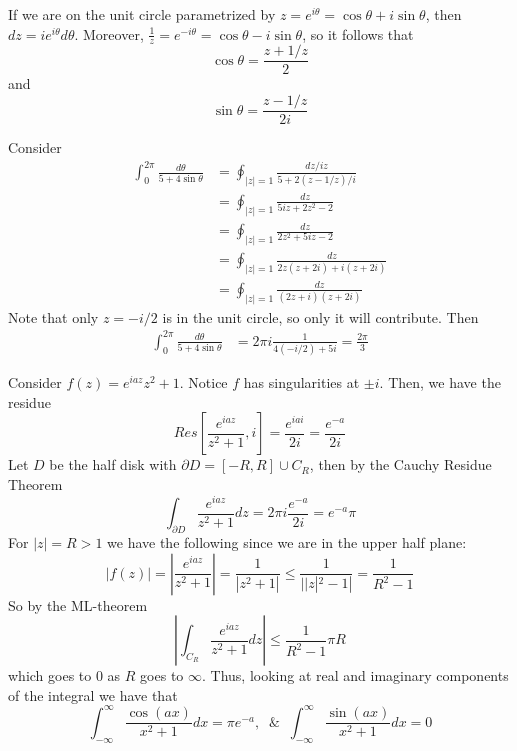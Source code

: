If we are on the unit circle parametrized by $z=e^{i\theta}=\cos\theta + i\sin\theta$, then $dz = ie^{i\theta}d\theta$. Moreover, $\frac{1}{z} = e^{-i\theta} = \cos\theta-i\sin\theta$, so it follows that $$\cos\theta = \frac{z+1/z}{2}$$ and $$\sin\theta = \frac{z-1/z}{2i}$$


\begin{example}
    Consider \begin{align*}
        \int_0^{2\pi}\frac{d\theta}{5+4\sin\theta} &= \oint_{|z|=1}\frac{dz/iz}{5+2(z-1/z)/i} \\
        &= \oint_{|z| = 1}\frac{dz}{5iz+2z^2-2} \\
        &= \oint_{|z| = 1}\frac{dz}{2z^2+5iz-2} \\
        &= \oint_{|z| =1}\frac{dz}{2z(z+2i)+i(z+2i)} \\
        &= \oint_{|z| = 1}\frac{dz}{(2z+i)(z+2i)}
    \end{align*}
    Note that only $z = -i/2$ is in the unit circle, so only it will contribute. Then \begin{align*}
        \int_0^{2\pi}\frac{d\theta}{5+4\sin\theta} &= 2\pi i\frac{1}{4(-i/2)+5i} = \frac{2\pi}{3}
    \end{align*}
\end{example}


\begin{example}
    Consider $f(z) = e^{iaz}{z^2+1}$. Notice $f$ has singularities at $\pm i$. Then, we have the residue \begin{equation*}
        Res\left[\frac{e^{iaz}}{z^2+1},i\right] = \frac{e^{iai}}{2i} = \frac{e^{-a}}{2i}
    \end{equation*}
    Let $D$ be the half disk with $\partial D = [-R,R]\cup C_R$, then by the Cauchy Residue Theorem \begin{equation*}
        \int_{\partial D}\frac{e^{iaz}}{z^2+1}dz = 2\pi i \frac{e^{-a}}{2i} = e^{-a}\pi
    \end{equation*}
    For $|z| = R > 1$ we have the following since we are in the upper half plane: \begin{equation*}
        |f(z)| = \left|\frac{e^{iaz}}{z^2+1}\right| = \frac{1}{|z^2+1|} \leq \frac{1}{||z|^2-1|} = \frac{1}{R^2-1}
    \end{equation*}
    So by the ML-theorem \begin{equation*}
        \left|\int_{C_R}\frac{e^{iaz}}{z^2+1}dz\right| \leq \frac{1}{R^2-1}\pi R
    \end{equation*}
    which goes to $0$ as $R$ goes to $\infty$. Thus, looking at real and imaginary components of the integral we have that \begin{equation*}
        \int_{-\infty}^{\infty}\frac{\cos(ax)}{x^2+1}dx = \pi e^{-a},\;\;\&\;\;\int_{-\infty}^{\infty}\frac{\sin(ax)}{x^2+1}dx = 0
    \end{equation*}
\end{example}



